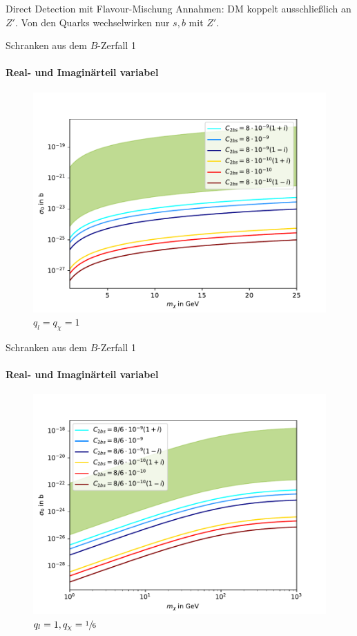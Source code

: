 \begin{frame}{Direct Detection mit Flavour-Mischung}
	Annahmen: DM koppelt ausschließlich an $Z'$. Von den Quarks wechselwirken nur $s,b$ mit $Z'$. \\
	\resizebox{.5\textwidth}{!}{
		
	}
\end{frame}


\begin{frame}{Schranken aus dem $B$-Zerfall 1}
\framesubtitle{Real- und Imaginärteil variabel}
	\begin{figure}
		\centering
		\includegraphics[width=.8\textwidth]{Bilder/Allgemein11.pdf}
		\caption{$q_l=q_\chi=1$}
	\end{figure}
\end{frame}
\begin{frame}[noframenumbering]{Schranken aus dem $B$-Zerfall 1}
\framesubtitle{Real- und Imaginärteil variabel}
	\begin{figure}
		\centering
		\includegraphics[width=.8\textwidth]{Bilder/Allgemein116.pdf}
		\caption{$q_l=1,q_\chi=\sfrac{1}{6}$}
	\end{figure}
\end{frame}


